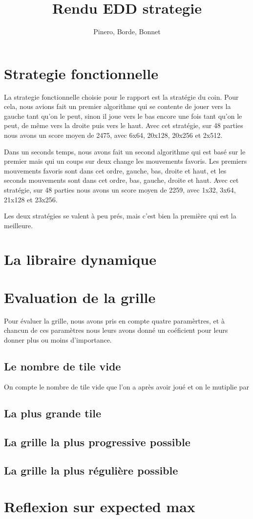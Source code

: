 \documentclass{article}
\title{Rendu EDD strategie}
\author{Pinero, Borde, Bonnet}
\begin{document}
\tableofcontents
\maketitle

\section{Strategie fonctionnelle}
La strategie fonctionnelle choisie pour le rapport est la stratégie du coin. Pour cela, nous avions fait un premier algorithme qui se contente de jouer vers la gauche tant qu'on le peut, sinon il joue vers le bas encore une fois tant qu'on le peut, de même vers la droite puis vers le haut. Avec cet stratégie, sur 48 parties nous avons un score moyen de 2475, avec 6x64, 20x128, 20x256 et 2x512.

Dans un seconds temps, nous avons fait un second algorithme qui est basé sur le premier mais qui un coups sur deux change les mouvements favoris. Les premiers mouvements favoris sont dans cet ordre, gauche, bas, droite et haut, et les seconds mouvements sont dans cet ordre, bas, gauche, droite et haut. Avec cet stratégie, sur 48 parties nous avons un score moyen de 2259, avec 1x32, 3x64, 21x128 et 23x256.

Les deux stratégies se valent à peu prés, mais c'est bien la première qui est la meilleure.

\section{La libraire dynamique}


\section{Evaluation de la grille}
Pour évaluer la grille, nous avons pris en compte quatre paramèrtres, et à chancun de ces paramètres nous leurs avons donné un coéficient pour leurs donner plus ou moins d'importance. 


	\subsection{Le nombre de tile vide}
	On compte le nombre de tile vide que l'on a après avoir joué et on le mutiplie par

	\subsection{La plus grande tile} 

	\subsection{La grille la plus progressive possible}

	\subsection{La grille la plus régulière possible}

\section{Reflexion sur expected max}
\end{document}
